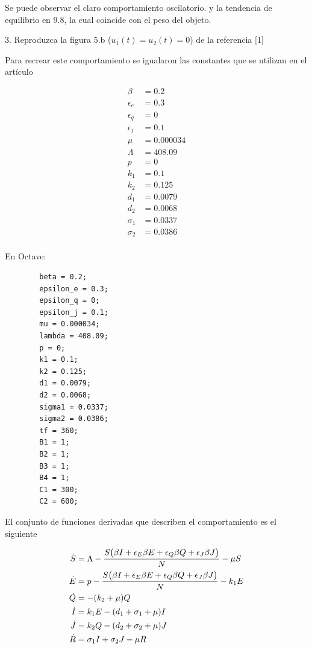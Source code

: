 \documentclass[a4paper, 12pt]{article}
\begin{document}
    Se puede observar el claro comportamiento oscilatorio. y la tendencia de equilibrio en 9.8, la cual coincide con el peso del objeto.

    3. Reproduzca la figura 5.b ($u_1(t) = u_2(t) = 0$) de la referencia [1]

    Para recrear este comportamiento se igualaron las constantes que se utilizan en el artículo

    \begin{align*}
        \beta &= 0.2 \\
        \epsilon_e &= 0.3 \\
        \epsilon_q &= 0 \\ 
        \epsilon_j &= 0.1 \\
        \mu &= 0.000034 \\
        \Lambda &= 408.09 \\
        p &= 0 \\
        k_1 &= 0.1\\
        k_2 &= 0.125\\
        d_1 &= 0.0079\\
        d_2 &= 0.0068 \\
        \sigma_1 &= 0.0337 \\
        \sigma_2 &= 0.0386 \\
    \end{align*}

    En Octave:

    \begin{verbatim}
        beta = 0.2;
        epsilon_e = 0.3;
        epsilon_q = 0;
        epsilon_j = 0.1;
        mu = 0.000034;
        lambda = 408.09;
        p = 0;
        k1 = 0.1;
        k2 = 0.125;
        d1 = 0.0079;
        d2 = 0.0068;
        sigma1 = 0.0337;
        sigma2 = 0.0386;
        tf = 360;
        B1 = 1;
        B2 = 1;
        B3 = 1;
        B4 = 1;
        C1 = 300;
        C2 = 600;
    \end{verbatim}

    El conjunto de funciones derivadas que describen el comportamiento es el siguiente

    \begin{align*}
        \dot{S} &= \Lambda - \frac{S\qty(\beta I + \epsilon_E \beta E + \epsilon_Q \beta Q + \epsilon_J \beta J)}{N} - \mu S \\
        \dot{E} &= p - \frac{S\qty(\beta I + \epsilon_E \beta E + \epsilon_Q \beta Q + \epsilon_J \beta J)}{N} - k_1 E \\
        \dot{Q} &= -(k_2 + \mu) Q \\
        \dot{I} &= k_1 E - \qty(d_1 + \sigma_1 + \mu) I \\
        \dot{J} &= k_2 Q - \qty(d_2 + \sigma_2 + \mu) J \\
        \dot{R} &= \sigma_1 I + \sigma_2 J - \mu R
    \end{align*}
\end{document}
